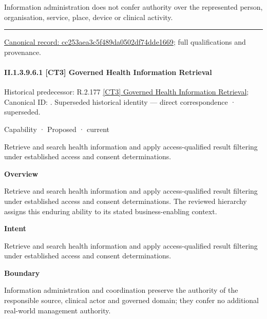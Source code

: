 Information administration does not confer authority over the represented person, organisation, service, place, device or clinical activity.



\medskip\hrule\medskip

{\footnotesize \href{../../../../../../../continuum/strategy/capability/cc253aea3c5f489da0502df74dde1669.md}{Canonical record: cc253aea3c5f489da0502df74dde1669}; full qualifications and provenance.}\par
\paragraph*{II.1.3.9.6.1 [CT3] Governed Health Information Retrieval}
\label{navigation:II.1.3.9.6.1}

{\small Historical predecessor: R.2.177 \hyperref[element:90b838d703dd472b8b6d74961f3a748c]{[CT3] Governed Health Information Retrieval}; Canonical ID: \texttt{}. Superseded historical identity — direct correspondence · superseded.}\par
\label{element:76e74e46ca4d44a1a7bb116b358f231c}
{\small Capability · Proposed · current}\par

Retrieve and search health information and apply access-qualified result filtering under established access and consent determinations.



\textbf{Overview}



Retrieve and search health information and apply access-qualified result filtering under established access and consent determinations. The reviewed hierarchy assigns this enduring ability to its stated business-enabling context.



\textbf{Intent}



Retrieve and search health information and apply access-qualified result filtering under established access and consent determinations.



\textbf{Boundary}



Information administration and coordination preserve the authority of the responsible source, clinical actor and governed domain; they confer no additional real-world management authority.


